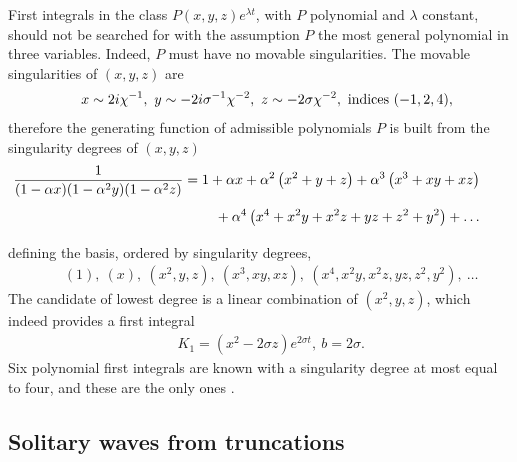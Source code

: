 \documentclass[10pt]{article}
\begin{document}
First integrals in the class $P(x,y,z) e^{\lambda t}$,
with $P$ polynomial and $\lambda$ constant,
should not be searched for with the assumption $P$ the most general polynomial
in three variables.
Indeed, $P$ must have no movable singularities.
The movable singularities of $(x,y,z)$ are
\begin{eqnarray}
& &
x \sim  2 i             \chi^{-1},\
y \sim -2 i \sigma^{-1} \chi^{-2},\
z \sim -2   \sigma      \chi^{-2},\
\hbox{indices } (-1,2,4),
\end{eqnarray}
therefore the generating function of admissible polynomials $P$
is built from the singularity degrees of $(x,y,z)$ \cite{LevineTabor}
\begin{eqnarray}
& &
{\hskip -10.0 truemm}
\frac{1}{(1 - \alpha x) (1 - \alpha^2 y) (1 - \alpha^2 z)}= 
1 + \alpha x + \alpha^2 \left(x^2+y+z \right)
  + \alpha^3 \left(x^3+xy+xz \right)
\nonumber
\\
& &
{\hskip -10.0 truemm}
\phantom{
\frac{1}{(1 - \alpha x) (1 - \alpha^2 y) (1 - \alpha^2 z)}
}
  + \alpha^4 \left(x^4+x^2 y+ x^2 z+ y z+ z^2+ y^2 \right)
+ \dots
\end{eqnarray}
defining the basis, ordered by singularity degrees,
\begin{eqnarray}
& &
(1),\
(x),\
(x^2,y,z),\
(x^3,x y, x z),\
(x^4,x^2 y, x^2 z, y z, z^2, y^2),\
\dots
\end{eqnarray}
The candidate of lowest degree is a linear combination of $(x^2,y,z)$,
which indeed provides a first integral \cite{Segur}
\begin{eqnarray}
& &
K_1 = (x^2 - 2 \sigma z) e^{2 \sigma t},\ b=2 \sigma.
\end{eqnarray}
Six polynomial first integrals are known \cite{Kus} with a singularity degree
at most equal to four,
and these are the only ones \cite{LlibreZhang}.

\subsection{Solitary waves from truncations}
\label{sectionKS}
\end{document}
